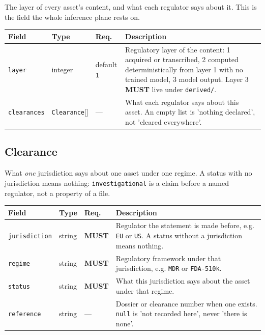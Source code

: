 \documentclass[11pt,a4paper]{article}
\newcommand{\MUST}{\textcolor{uosred}{\textbf{MUST}}}
\newcommand{\code}[1]{\texttt{\small #1}}
\begin{document}
The layer of every asset's content, and what each regulator says about it. This is the field the whole inference plane rests on.

\begin{longtable}{L{3.5cm} L{3.0cm} C{1.4cm} L{6.4cm}}
\toprule
\textbf{Field} & \textbf{Type} & \textbf{Req.} & \textbf{Description}\\
\midrule
\endhead
\code{layer} & integer & default \code{1} & Regulatory layer of the content: 1 acquired or transcribed, 2 computed deterministically from layer 1 with no trained model, 3 model output. Layer 3 \MUST{} live under \code{derived/}.\\
\code{clearances} & \code{Clearance}[] & --- & What each regulator says about this asset. An empty list is 'nothing declared', not 'cleared everywhere'.\\
\bottomrule
\end{longtable}

\subsection{Clearance}

What \emph{one} jurisdiction says about one asset under one regime. A status with no jurisdiction means nothing: \code{investigational} is a claim before a named regulator, not a property of a file.

\begin{longtable}{L{3.5cm} L{3.0cm} C{1.4cm} L{6.4cm}}
\toprule
\textbf{Field} & \textbf{Type} & \textbf{Req.} & \textbf{Description}\\
\midrule
\endhead
\code{jurisdiction} & string & \MUST{} & Regulator the statement is made before, e.g. \code{EU} or \code{US}. A status without a jurisdiction means nothing.\\
\code{regime} & string & \MUST{} & Regulatory framework under that jurisdiction, e.g. \code{MDR} or \code{FDA-510k}.\\
\code{status} & string & \MUST{} & What this jurisdiction says about the asset under that regime.\\
\code{reference} & string & --- & Dossier or clearance number when one exists. \code{null} is 'not recorded here', never 'there is none'.\\
\bottomrule
\end{longtable}
\end{document}
